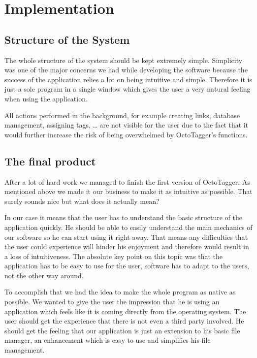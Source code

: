 \section{Implementation}
\def\kapitelautor{Christoph Führer}

\subsection{Structure of the System}
The whole structure of the system should be kept extremely simple. Simplicity was one of the major concerns we had while developing the software because the success of the application relies a lot on being intuitive and simple. Therefore it is just a sole program in a single window which gives the user a very natural feeling when using the application.

All actions performed in the background, for example creating links, database management, assigning tags, \ldots{} are not visible for the user due to the fact that it would further increase the risk of being overwhelmed by OctoTagger's functions.

\subsection{The final product}
After a lot of hard work we managed to finish the first version of OctoTagger. As mentioned above we made it our business to make it as intuitive as possible. That surely sounds nice but what does it actually mean?

In our case it means that the user has to understand the basic structure of the application quickly. He should be able to easily understand the main mechanics of our software so he can start using it right away. That means any difficulties that the user could experience will hinder his enjoyment and therefore would result in a loss of intuitiveness. The absolute key point on this topic was that the application has to be easy to use for the user, software has to adapt to the users, not the other way around.

To accomplish that we had the idea to make the whole program as native as possible. We wanted to give the user the impression that he is using an application which feels like it is coming directly from the operating system. The user should get the experience that there is not even a third party involved. He should get the feeling that our application is just an extension to his basic file manager, an enhancement which is easy to use and simplifies his file management.

